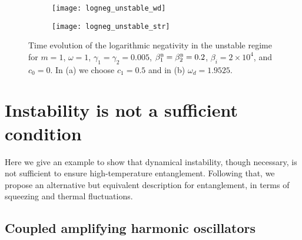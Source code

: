 \documentclass[11pt,a4paper]{article}
\begin{document}
 
 

 \begin{figure}
  	\begin{subfigure}{0.49\textwidth}
     	\texttt{[image: logneg\_unstable\_wd]}     
     	\caption{}
		\label{fig:unstable-wd} 
	\end{subfigure}
 	\hfill
	\begin{subfigure}{0.49\textwidth}
     	\texttt{[image: logneg\_unstable\_str]}
     	\caption{}
		\label{fig:unstable-str} 
	\end{subfigure}
	\caption{Time evolution of the logarithmic negativity in the unstable regime for  $m = 1$, $\omega = 1$, $\gamma_{1}=\gamma_{2}= 0.005$, $\beta^{\textsc{b}}_{1}=\beta^{\textsc{b}}_{2}= 0.2$, $\beta_i = 2\times 10^4$, and $c_0 = 0$. In (a) we choose $c_1 = 0.5$ and in (b) $\omega_d = 1.9525$.}
	\label{fig:galve-sympeigen-stable-terms2}
\end{figure}

\section{Instability is not a sufficient condition}\label{S:eoujhbdf}


Here we give an example to show that dynamical instability, though necessary, is not sufficient to ensure high-temperature entanglement. Following that,  we propose an alternative but equivalent description for entanglement, in terms of squeezing and thermal fluctuations.

\subsection{Coupled amplifying harmonic oscillators}
 
\end{document}
